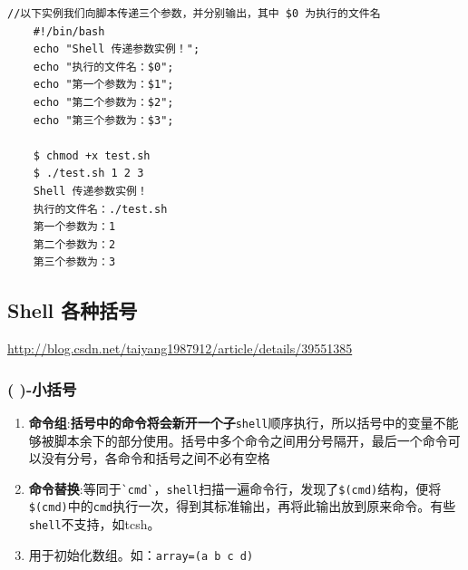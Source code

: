 \documentclass[UTF8,a4paper,12pt]{ctexbook}
\begin{document}
			 \begin{lstlisting}[xleftmargin=.06\textwidth]
	//以下实例我们向脚本传递三个参数，并分别输出，其中 $0 为执行的文件名
	#!/bin/bash	
	echo "Shell 传递参数实例！";
	echo "执行的文件名：$0";
	echo "第一个参数为：$1";
	echo "第二个参数为：$2";
	echo "第三个参数为：$3";
	
	$ chmod +x test.sh 
	$ ./test.sh 1 2 3
	Shell 传递参数实例！
	执行的文件名：./test.sh
	第一个参数为：1
	第二个参数为：2
	第三个参数为：3
			 \end{lstlisting}
			 
		\subsection{Shell 各种括号}
			\url{http://blog.csdn.net/taiyang1987912/article/details/39551385}
			\subsubsection{( )-小括号}
				\begin{enumerate}
					\item \textbf{命令组}:\textbf{括号中的命令将会新开一个子}\verb|shell|顺序执行，所以括号中的变量不能够被脚本余下的部分使用。括号中多个命令之间用分号隔开，最后一个命令可以没有分号，各命令和括号之间不必有空格
					\item \textbf{命令替换}:等同于\verb|`cmd`|，\verb|shell|扫描一遍命令行，发现了\verb|$(cmd)|结构，便将\verb|$(cmd)|中的\verb|cmd|执行一次，得到其标准输出，再将此输出放到原来命令。有些\verb|shell|不支持，如tcsh。
					\item 用于初始化数组。如：\verb|array=(a b c d)|
				\end{enumerate}
\end{document}
